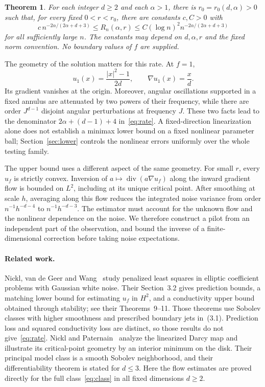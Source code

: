 \documentclass[11pt]{article}
\newtheorem{theorem}{Theorem}[section]
\theoremstyle{remark}
\newcommand{\diver}{\operatorname{div}}
\newcommand{\abs}[1]{\lvert #1\rvert}
\begin{document}
\begin{theorem}\label{thm:main}
For each integer $d\ge2$ and each $\alpha>1$, there is $r_0=r_0(d,\alpha)>0$ such that, for every fixed $0<r<r_0$, there are constants $c,C>0$ with
\begin{equation}\label{eq:rate}
 c\,n^{-2\alpha/(2\alpha+d+3)}
 \le R_n(\alpha,r)
 \le C(\log n)^2n^{-2\alpha/(2\alpha+d+3)}
\end{equation}
for all sufficiently large $n$. The constants may depend on $d,\alpha,r$ and the fixed norm convention. No boundary values of $f$ are supplied.
\end{theorem}

The geometry of the solution matters for this rate. At $f=1$,
\begin{equation}\label{eq:base}
 u_1(x)=\frac{\abs{x}^2-1}{2d},\qquad \nabla u_1(x)=\frac{x}{d}.
\end{equation}
Its gradient vanishes at the origin. Moreover, angular oscillations supported in a fixed annulus are attenuated by two powers of their frequency, while there are order $J^{d-1}$ disjoint angular perturbations at frequency $J$. These two facts lead to the denominator $2\alpha+(d-1)+4$ in~\eqref{eq:rate}. A fixed-direction linearization alone does not establish a minimax lower bound on a fixed nonlinear parameter ball; Section~\ref{sec:lower} controls the nonlinear errors uniformly over the whole testing family.

The upper bound uses a different aspect of the same geometry. For small $r$, every $u_f$ is strictly convex. Inversion of $a\mapsto\diver(a\nabla u_f)$ along the inward gradient flow is bounded on $L^2$, including at its unique critical point. After smoothing at scale $h$, averaging along this flow reduces the integrated noise variance from order $n^{-1}h^{-d-4}$ to $n^{-1}h^{-d-3}$. The estimator must account for the unknown flow and the nonlinear dependence on the noise. We therefore construct a pilot from an independent part of the observation, and bound the inverse of a finite-dimensional correction before taking noise expectations.

\paragraph{Related work.}
Nickl, van de Geer and Wang~\cite{NVW} study penalized least squares in elliptic coefficient problems with Gaussian white noise. Their Section~3.2 gives prediction bounds, a matching lower bound for estimating $u_f$ in $H^2$, and a conductivity upper bound obtained through stability; see their Theorems~9--11. Those theorems use Sobolev classes with higher smoothness and prescribed boundary jets in~(3.1). Prediction loss and squared conductivity loss are distinct, so those results do not give~\eqref{eq:rate}. Nickl and Paternain~\cite[Sections~3.1--3.3]{NP} analyze the linearized Darcy map and illustrate its critical-point geometry by an interior minimum on the disk. Their principal model class is a smooth Sobolev neighborhood, and their differentiability theorem is stated for $d\le3$. Here the flow estimates are proved directly for the full class~\eqref{eq:class} in all fixed dimensions $d\ge2$.
\end{document}
